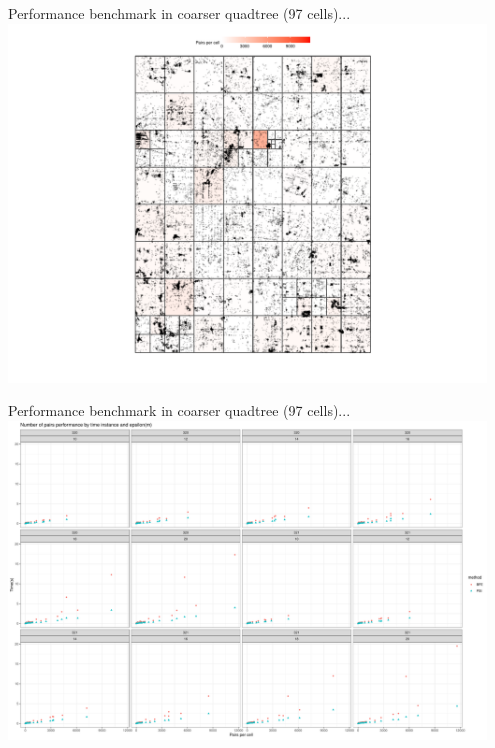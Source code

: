 \documentclass{beamer}
\begin{document}

\begin{frame}{Performance benchmark in coarser quadtree (97 cells)...}
    \centering
    \includegraphics[width=0.95\textwidth]{figures/coarser/pairs_per_cell}
\end{frame}

\begin{frame}{Performance benchmark in coarser quadtree (97 cells)...}
    \centering
    \includegraphics[width=0.95\textwidth]{figures/coarser/psi_pairs}
\end{frame}
\end{document}
